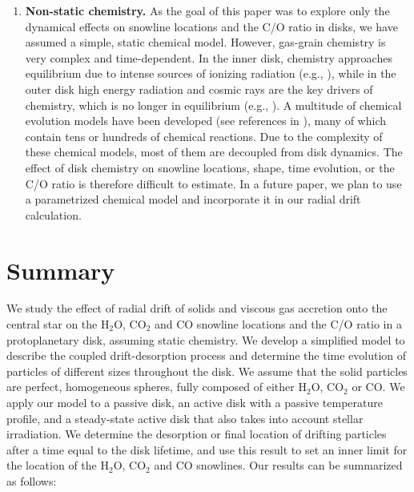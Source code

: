 \documentclass[apj]{emulateapj}
\newcommand{\emgr}[1]{\emph{ \color{gray} #1}}
\begin{document}
\begin{enumerate}
\item \textbf{Non-static chemistry.} As the goal of this paper was to explore only the dynamical effects on snowline locations and the C/O ratio in disks, we have assumed a simple, static chemical model. However, gas-grain chemistry is very complex and time-dependent. In the inner disk, chemistry approaches equilibrium due to intense sources of ionizing radiation (e.g., \citealt{ilgner04}), while in the outer disk high energy radiation and cosmic rays are the key drivers of chemistry, which is no longer in equilibrium (e.g., \citealt{vandishoeck06}). A multitude of chemical evolution models have been developed (see references in \citealt{henning13}), many of which contain tens or hundreds of chemical reactions. Due to the complexity of these chemical models, most of them are decoupled from disk dynamics. The effect of disk chemistry on snowline locations, shape, time evolution, or the C/O ratio is therefore difficult to estimate.  In a future paper, we plan to use a parametrized chemical model and incorporate it in our radial drift calculation. 


\end{enumerate}




\section{Summary}
\label{sec:summary}

We study the effect of radial drift of solids and viscous gas accretion onto the central star on the H$_2$O, CO$_2$ and CO snowline locations and the C/O ratio in a protoplanetary disk, assuming static chemistry. We develop a simplified model to describe the coupled drift-desorption process and determine the time evolution of particles of different sizes throughout the disk. We assume that the solid particles are perfect, homogeneous spheres, fully composed of either H$_2$O, CO$_2$ or CO. We apply our model to a passive disk, an active disk with a passive temperature profile, and a steady-state active disk that also takes into account stellar irradiation. We determine the desorption or final location of drifting particles after a time equal to the disk lifetime, and use this result to set an inner limit for the location of the H$_2$O, CO$_2$ and CO snowlines. Our results can be summarized as follows:
\end{document}
